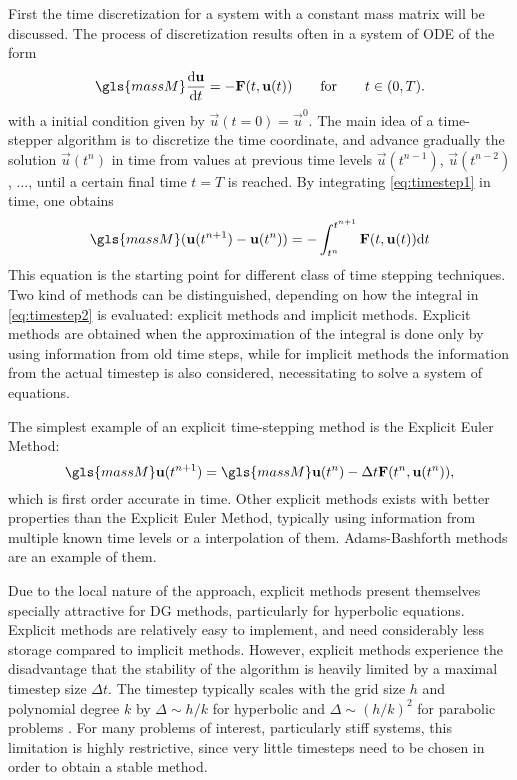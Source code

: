First the time discretization for a system with a constant mass matrix will be discussed. The process of discretization results often in a system of \gls{ODE} of the form
\begin{equation}
\gls{massM}\frac{\text{d}\vec{u}}{\text{d}t} = - \vec{F}(t,\vec{u}(t))\qquad \text{for}\qquad t \in (0,T).\label{eq:timestep1}
\end{equation}
with a initial condition given by $\vec{u}(t=0) = \vec{u}^0$. The main idea of a time-stepper algorithm is to discretize the time coordinate, and advance gradually the solution $\vec{u}(t^n)$ in time from values at previous time levels $\vec{u}(t^{n-1})$, $\vec{u}(t^{n-2})$, $\dots$,  until a certain final time $t = T$ is reached.
By integrating \cref{eq:timestep1} in time, one obtains
\begin{equation}
\gls{massM}(\vec{u}(t^{n+1})-\vec{u}(t^{n})) = - \int_{t^n}^{t^{n+1}}\vec{F}(t,\vec{u}(t)) \text{d}t \label{eq:timestep2}
\end{equation}
This equation is the starting point for different class of time stepping techniques. Two kind of methods can be distinguished, depending on how the integral in \cref{eq:timestep2} is evaluated: explicit methods and implicit methods. Explicit methods are obtained when the approximation of the integral is done only by using information from old time steps, while for implicit methods the information from the actual timestep is also considered, necessitating to solve a system of equations.

The simplest example of an explicit time-stepping method is the Explicit Euler Method:
\begin{equation}
\gls{massM}\vec{u}(t^{n+1})= \gls{massM}\vec{u}(t^{n})  - \Delta t \vec{F}(t^n,\vec{u}(t^n)),
\end{equation}
which is first order accurate in time. Other explicit methods exists with better properties than the Explicit Euler Method, typically using information from multiple known time levels or a interpolation of them. Adams-Bashforth methods are an example of them. 

Due to the local nature of the approach, explicit methods present themselves specially attractive for DG methods, particularly for hyperbolic equations. Explicit methods are relatively easy to implement, and need considerably less storage compared to implicit methods. However, explicit methods experience the disadvantage that the stability of the algorithm is heavily limited by a maximal timestep size $\Delta t$. The timestep typically scales with the grid size $h$ and polynomial degree $k$ by $\Delta \sim h/k$ for hyperbolic and $\Delta \sim (h/k)^2$ for parabolic problems \parencite{gassnerContributionConstructionDiffusion2007}. For many problems of interest, particularly stiff systems, this limitation is highly restrictive, since very little timesteps need to be chosen in order to obtain a stable method. 

